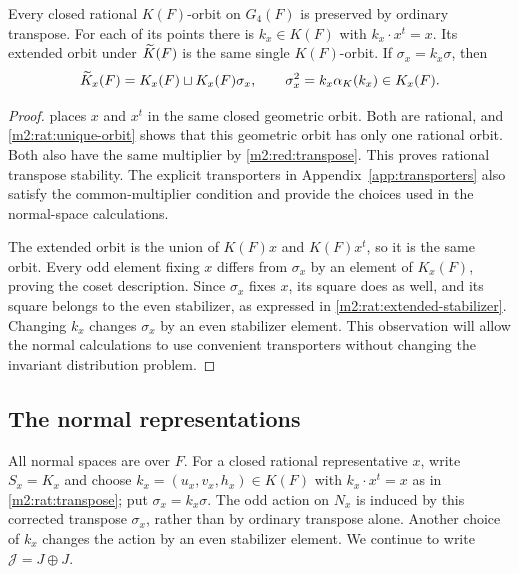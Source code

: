 \begin{theorem}\label{m2:rat:transpose}
Every closed rational $K(F)$-orbit on $G_4(F)$ is
preserved by ordinary transpose.  For each of its
points there is $k_x\in K(F)$ with $k_x\cdot x^t=x$.
Its extended orbit under $\widetilde K(F)$ is the same
single $K(F)$-orbit.  If $\sigma_x=k_x\sigma$, then
\begin{equation}\label{m2:rat:extended-stabilizer}
 \widetilde K_x(F)=K_x(F)\sqcup K_x(F)\sigma_x,
 \qquad \sigma_x^2=k_x\alpha_K(k_x)\in K_x(F).
\end{equation}
\end{theorem}

\begin{proof}
 places $x$ and $x^t$ in the
same closed geometric orbit.  Both are rational,
and \eqref{m2:rat:unique-orbit} shows that this
geometric orbit has only one rational orbit.
Both also have the same multiplier by \cref{m2:red:transpose}.
This proves rational transpose stability. The explicit transporters in
Appendix~\ref{app:transporters} also satisfy the common-multiplier
condition and provide the choices used in the normal-space calculations.

The extended orbit is the union of $K(F)x$ and
$K(F)x^t$, so it is the same orbit.  Every odd
element fixing $x$ differs from $\sigma_x$ by
an element of $K_x(F)$, proving the coset
description.  Since $\sigma_x$ fixes $x$, its
square does as well, and its square belongs to the
even stabilizer, as expressed in \eqref{m2:rat:extended-stabilizer}.
Changing $k_x$ changes $\sigma_x$ by an even
stabilizer element.  This observation will allow
the normal calculations to use convenient
transporters without changing the invariant
distribution problem.
\end{proof}

\subsection{The normal representations}\label{m2:nor:section}

All normal spaces are over $F$. For a closed rational representative $x$,
write $S_x=K_x$ and choose $k_x=(u_x,v_x,h_x)\in K(F)$ with
$k_x\cdot x^t=x$ as in \cref{m2:rat:transpose}; put $\sigma_x=k_x\sigma$.
The odd action on $N_x$ is induced by this corrected transpose
$\sigma_x$, rather than by ordinary transpose alone. Another choice
of $k_x$ changes the action by an even stabilizer element.
We continue to write $\mathcal J=J\oplus J$.

